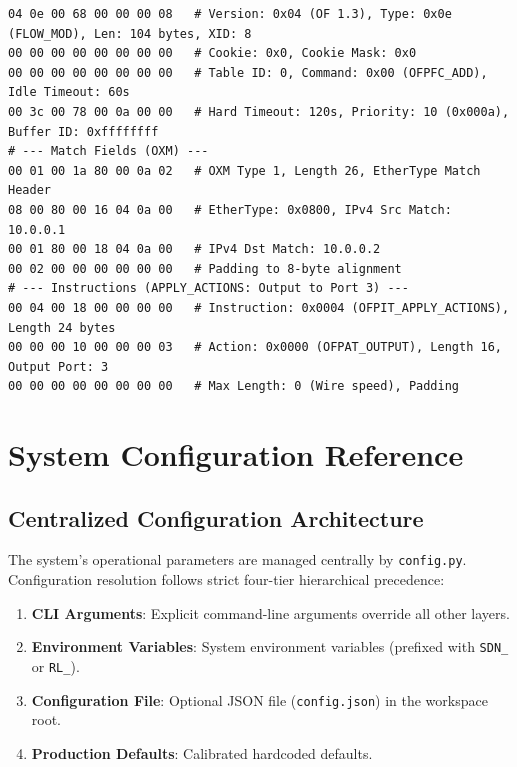 \documentclass[12pt,a4paper,oneside]{report}
\begin{document}
\begin{lstlisting}[basicstyle=\ttfamily\scriptsize, caption={Annotated Hex Dump of OFPFlowMod Installation Message}, label={lst:flow_mod_hex}]
04 0e 00 68 00 00 00 08   # Version: 0x04 (OF 1.3), Type: 0x0e (FLOW_MOD), Len: 104 bytes, XID: 8
00 00 00 00 00 00 00 00   # Cookie: 0x0, Cookie Mask: 0x0
00 00 00 00 00 00 00 00   # Table ID: 0, Command: 0x00 (OFPFC_ADD), Idle Timeout: 60s
00 3c 00 78 00 0a 00 00   # Hard Timeout: 120s, Priority: 10 (0x000a), Buffer ID: 0xffffffff
# --- Match Fields (OXM) ---
00 01 00 1a 80 00 0a 02   # OXM Type 1, Length 26, EtherType Match Header
08 00 80 00 16 04 0a 00   # EtherType: 0x0800, IPv4 Src Match: 10.0.0.1
00 01 80 00 18 04 0a 00   # IPv4 Dst Match: 10.0.0.2
00 02 00 00 00 00 00 00   # Padding to 8-byte alignment
# --- Instructions (APPLY_ACTIONS: Output to Port 3) ---
00 04 00 18 00 00 00 00   # Instruction: 0x0004 (OFPIT_APPLY_ACTIONS), Length 24 bytes
00 00 00 10 00 00 00 03   # Action: 0x0000 (OFPAT_OUTPUT), Length 16, Output Port: 3
00 00 00 00 00 00 00 00   # Max Length: 0 (Wire speed), Padding
\end{lstlisting}


\chapter{System Configuration Reference}
\label{app:config}

\section{Centralized Configuration Architecture}
The system's operational parameters are managed centrally by \texttt{config.py}. Configuration resolution follows strict four-tier hierarchical precedence:
\begin{enumerate}
    \item \textbf{CLI Arguments}: Explicit command-line arguments override all other layers.
    \item \textbf{Environment Variables}: System environment variables (prefixed with \texttt{SDN\_} or \texttt{RL\_}).
    \item \textbf{Configuration File}: Optional JSON file (\texttt{config.json}) in the workspace root.
    \item \textbf{Production Defaults}: Calibrated hardcoded defaults.
\end{enumerate}
\end{document}
